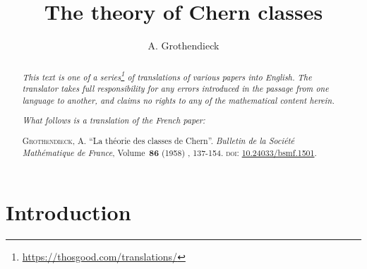 \documentclass{article}
\title{The theory of Chern classes}
\author{A. Grothendieck}
\date{}
\theoremstyle{plain}
\theoremstyle{definition}
\begin{document}
\maketitle
\thispagestyle{fancy}

\renewcommand{\abstractname}{Translator's note.}

\begin{abstract}
  \renewcommand*{\thefootnote}{\fnsymbol{footnote}}
  \emph{This text is one of a series\footnote{\url{https://thosgood.com/translations/}} of translations of various papers into English.}
  \emph{The translator takes full responsibility for any errors introduced in the passage from one language to another, and claims no rights to any of the mathematical content herein.}

  \medskip
  
  \emph{What follows is a translation of the French paper:}

  \medskip\noindent
  \textsc{Grothendieck, A.}
  ``La th\'{e}orie des classes de Chern''.
  \emph{Bulletin de la Soci\'{e}t\'{e} Math\'{e}matique de France}, Volume~\textbf{86} (1958) , 137-154.
  \textsc{doi}: \href{https://www.doi.org/10.24033/bsmf.1501}{10.24033/bsmf.1501}.
\end{abstract}

\setcounter{footnote}{0}

\tableofcontents





\section*{Introduction}
\end{document}
